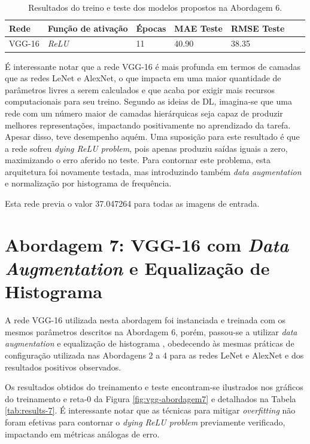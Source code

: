 		\begin{table}[!ht]
			\centering
			\caption{Resultados do treino e teste dos modelos propostos na Abordagem 6.}
			\label{tab:results-6}
			\begin{tabular}{l l l l l l l}
				\toprule
				Rede & Função de ativação & Épocas & MAE Teste & RMSE Teste \\
				\midrule
				VGG-16 & \emph{ReLU} & 11 & 40.90 & 38.35 \\
				\bottomrule
			\end{tabular}
		\end{table}

		É interessante notar que a rede VGG-16 é mais profunda em termos de camadas que as redes LeNet e AlexNet, o que impacta em uma maior quantidade de parâmetros livres a serem calculados e que acaba por exigir mais recursos computacionais para seu treino. Segundo as ideias de DL, imagina-se que uma rede com um número maior de camadas hierárquicas seja capaz de produzir melhores representações, impactando positivamente no aprendizado da tarefa. Apesar disso, teve desempenho aquém. Uma suposição para este resultado é que a rede sofreu \emph{dying ReLU problem}, pois apenas produziu saídas iguais a zero, maximizando o erro aferido no teste. Para contornar este problema, esta arquitetura foi novamente testada, mas introduzindo também \emph{data augmentation} e normalização por histograma de frequência.

		Esta rede previa o valor 37.047264 para todas as imagens de entrada.

\section{Abordagem 7: VGG-16 com \emph{Data Augmentation} e Equalização de Histograma}

	A rede VGG-16 utilizada nesta abordagem foi instanciada e treinada com os mesmos parâmetros descritos na Abordagem 6, porém, passou-se a utilizar \emph{data augmentation} e equalização de histograma , obedecendo às mesmas práticas de configuração utilizada nas Abordagens 2 a 4 para as redes LeNet e AlexNet e dos resultados positivos observados.

	Os resultados obtidos do treinamento e teste encontram-se ilustrados nos gráficos do treinamento e reta-0 da Figura \ref{fig:vgg-abordagem7} e detalhados na Tabela \ref{tab:results-7}. É interessante notar que as técnicas para mitigar \emph{overfitting} não foram efetivas para contornar o \emph{dying ReLU problem} previamente verificado, impactando em métricas análogas de erro.

